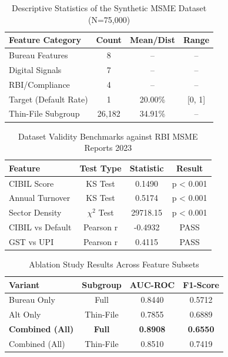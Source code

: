 
\begin{table}[!t]
\renewcommand{\arraystretch}{1.3}
\caption{Descriptive Statistics of the Synthetic MSME Dataset (N=75,000)}
\label{table_stats}
\centering
\begin{tabular}{l|c|c|c}
\hline
Feature Category & Count & Mean/Dist & Range \\
\hline
Bureau Features & 8 & -- & -- \\
Digital Signals & 7 & -- & -- \\
RBI/Compliance & 4 & -- & -- \\
Target (Default Rate) & 1 & 20.00\% & [0, 1] \\
Thin-File Subgroup & 26,182 & 34.91\% & -- \\
\hline
\end{tabular}
\end{table}

\begin{table}[!t]
\renewcommand{\arraystretch}{1.3}
\caption{Dataset Validity Benchmarks against RBI MSME Reports 2023}
\label{table_validity}
\centering
\begin{tabular}{l|c|c|c}
\hline
Feature & Test Type & Statistic & Result \\
\hline
CIBIL Score & KS Test & 0.1490 & p < 0.001 \\
Annual Turnover & KS Test & 0.5174 & p < 0.001 \\
Sector Density & $\chi^2$ Test & 29718.15 & p < 0.001 \\
CIBIL vs Default & Pearson r & -0.4932 & PASS \\
GST vs UPI & Pearson r & 0.4115 & PASS \\
\hline
\end{tabular}
\end{table}

\begin{table}[!t]
\renewcommand{\arraystretch}{1.3}
\caption{Ablation Study Results Across Feature Subsets}
\label{table_ablation}
\centering
\begin{tabular}{l|c|c|c}
\hline
Variant & Subgroup & AUC-ROC & F1-Score \\
\hline
Bureau Only & Full & 0.8440 & 0.5712 \\
Alt Only & Thin-File & 0.7855 & 0.6889 \\
\textbf{Combined (All)} & \textbf{Full} & \textbf{0.8908} & \textbf{0.6550} \\
Combined (All) & Thin-File & 0.8510 & 0.7419 \\
\hline
\end{tabular}
\end{table}

